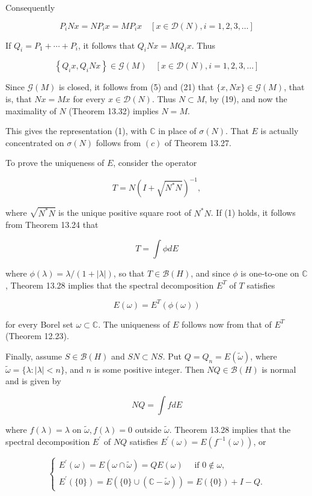 \documentclass[10pt]{article}
\begin{document}
Consequently

$$
P_{i} N x=N P_{i} x=M P_{i} x \quad[x \in \mathscr{D}(N), i=1,2,3, \ldots]
$$

If $Q_{i}=P_{1}+\cdots+P_{i}$, it follows that $Q_{i} N x=M Q_{i} x$. Thus

$$
\left\{Q_{i} x, Q_{i} N x\right\} \in \mathscr{G}(M) \quad[x \in \mathscr{D}(N), i=1,2,3, \ldots]
$$

Since $\mathscr{G}(M)$ is closed, it follows from (5) and (21) that $\{x, N x\} \in \mathscr{G}(M)$, that is, that $N x=M x$ for every $x \in \mathscr{D}(N)$. Thus $N \subset M$, by (19), and now the maximality of $N$ (Theorem 13.32) implies $N=M$.

This gives the representation (1), with $\mathbb{C}$ in place of $\sigma(N)$. That $E$ is actually concentrated on $\sigma(N)$ follows from $(c)$ of Theorem 13.27.

To prove the uniqueness of $E$, consider the operator

$$
T=N\left(I+\sqrt{N^{*} N}\right)^{-1},
$$

where $\sqrt{N^{*} N}$ is the unique positive square root of $N^{*} N$. If (1) holds, it follows from Theorem 13.24 that

$$
T=\int \phi d E
$$

where $\phi(\lambda)=\lambda /(1+|\lambda|)$, so that $T \in \mathscr{B}(H)$, and since $\phi$ is one-to-one on $\mathbb{C}$, Theorem 13.28 implies that the spectral decomposition $E^{T}$ of $T$ satisfies

$$
E(\omega)=E^{T}(\phi(\omega))
$$

for every Borel set $\omega \subset \mathbb{C}$. The uniqueness of $E$ follows now from that of $E^{T}$ (Theorem 12.23).

Finally, assume $S \in \mathscr{B}(H)$ and $S N \subset N S$. Put $Q=Q_{n}=E(\tilde{\omega})$, where $\tilde{\omega}=\{\lambda:|\lambda|<n\}$, and $n$ is some positive integer. Then $N Q \in \mathscr{B}(H)$ is normal and is given by

$$
N Q=\int f d E
$$

where $f(\lambda)=\lambda$ on $\tilde{\omega}, f(\lambda)=0$ outside $\tilde{\omega}$. Theorem 13.28 implies that the spectral decomposition $E^{\prime}$ of $N Q$ satisfies $E^{\prime}(\omega)=E\left(f^{-1}(\omega)\right)$, or

$$
\left\{\begin{array}{l}
E^{\prime}(\omega)=E(\omega \cap \tilde{\omega})=Q E(\omega) \quad \text { if } 0 \notin \omega, \\
E^{\prime}(\{0\})=E(\{0\} \cup(\mathbb{C}-\tilde{\omega}))=E(\{0\})+I-Q .
\end{array}\right.
$$
\end{document}
